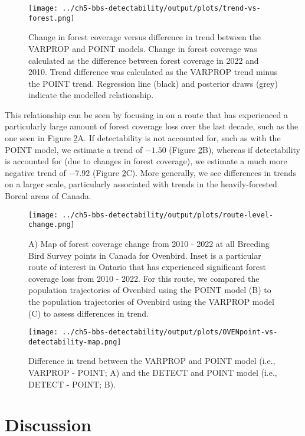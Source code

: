 \begin{figure}[h]
	\texttt{[image: ../ch5-bbs-detectability/output/plots/trend-vs-forest.png]}
	\caption{Change in forest coverage versus difference in trend between the VARPROP and POINT models. Change in forest coverage was calculated as the difference between forest coverage in 2022 and 2010. Trend difference was calculated as the VARPROP trend minus the POINT trend. Regression line (black) and posterior draws (grey) indicate the modelled relationship.}
	\label{fig:trend-vs-forest}
\end{figure}

\par This relationship can be seen by focusing in on a route that has experienced a particularly large amount of forest coverage loss over the last decade, such as the one seen in Figure \ref{fig:route-change}A. 
If detectability is not accounted for, such as with the POINT model, we estimate a trend of $-1.50$ (Figure \ref{fig:route-change}B), whereas if detectability is accounted for (due to changes in forest coverage), we estimate a much more negative trend of $-7.92$ (Figure \ref{fig:route-change}C).
More generally, we see differences in trends on a larger scale, particularly associated with trends in the heavily-forested Boreal areas of Canada.

\begin{figure}[h]
	\texttt{[image: ../ch5-bbs-detectability/output/plots/route-level-change.png]}
	\caption{A) Map of forest coverage change from 2010 - 2022 at all Breeding Bird Survey points in Canada for Ovenbird. Inset is a particular route of interest in Ontario that has experienced significant forest coverage loss from 2010 - 2022. For this route, we compared the population trajectories of Ovenbird using the POINT model (B) to the population trajectories of Ovenbird using the VARPROP model (C) to assess differences in trend.}
	\label{fig:route-change}
\end{figure}

\begin{figure}[h]
	\texttt{[image: ../ch5-bbs-detectability/output/plots/OVENpoint-vs-detectability-map.png]}
	\caption{Difference in trend between the VARPROP and POINT model (i.e., VARPROP - POINT; A) and the DETECT and POINT model (i.e., DETECT - POINT; B).}
	\label{fig:point-vs-detectability}
\end{figure}

\section{Discussion}

